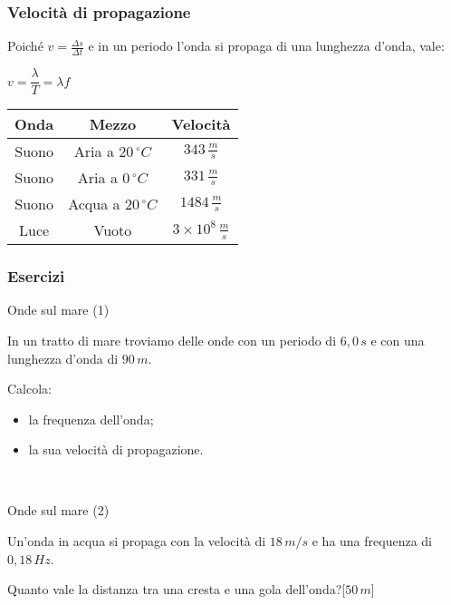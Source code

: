 \documentclass[]{beamer}
\theoremstyle{plain}
\begin{document}
\begin{frame}
  \frametitle{Velocità di propagazione}
  Poiché $ v = \frac{\Delta s}{\Delta t} $ e in un periodo l'onda si propaga di una lunghezza d'onda, vale:
  \begin{center}
  \colorbox{blue!30}{$ v = \dfrac{\lambda}{T} = \lambda f $}
  \end{center}\pause
  
  \centering
  \begin{tabular}{c|c|c}
    \textbf{Onda} & \textbf{Mezzo} & \textbf{Velocità} \\\hline\rule{0pt}{3ex}
    Suono & Aria a $ 20 \,{}^\circ C$ & $ 343 \, \frac{m}{s} $ \\\rule{0pt}{3ex}
    Suono & Aria a $ 0\,{}^\circ C $ & $ 331 \, \frac{m}{s} $ \\\rule{0pt}{3ex}
    Suono & Acqua a $ 20\,{}^\circ C $ & $ 1484 \, \frac{m}{s} $ \\\rule{0pt}{3ex}
    Luce & Vuoto & $ 3 \times 10^8 \, \frac{m}{s} $\\
  \end{tabular}
\end{frame}

\begin{frame}
\frametitle{Esercizi}
\begin{exampleblock}{Onde sul mare (1)}
  \small{In un tratto di mare troviamo delle onde con un periodo di $ 6,0 \, s $ e con una lunghezza d'onda di $ 90 \, m $.

  Calcola:
  \begin{itemize}
    \item la frequenza dell'onda;
    \item la sua velocità di propagazione.
  \end{itemize}  }
\end{exampleblock}

~

\begin{exampleblock}{Onde sul mare (2)}
  \small{Un'onda in acqua si propaga con la velocità di $ 18 \, m/s $ e ha una frequenza di $ 0,18 \, Hz $.
  
  Quanto vale la distanza tra una cresta e una gola dell'onda?\hspace*{\fill}[$ 50 \, m $]}
\end{exampleblock}
\end{frame}
\end{document}
